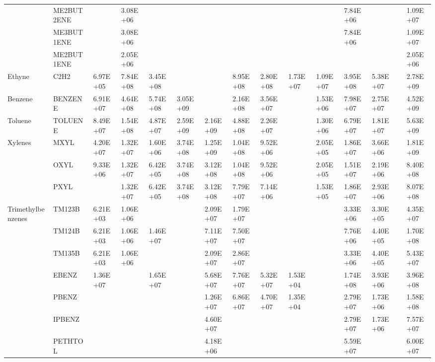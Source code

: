 \begin{longtable}{lllllllllllllll}
	 & ME2BUT2ENE &  & 3.08E+06 &  &  &  &  &  &  &  & 7.84E+06 &  &  & 1.09E+07 \\
	 & ME3BUT1ENE &  & 3.08E+06 &  &  &  &  &  &  &  & 7.84E+06 &  &  & 1.09E+07 \\
	 & ME2BUT1ENE &  & 2.05E+06 &  &  &  &  &  &  &  &  &  &  & 2.05E+06 \\
	\hline Ethyne & C2H2 & 6.97E+05 & 7.84E+08 & 3.45E+08 &  &  & 8.95E+08 & 2.80E+08 & 1.73E+07 & 1.09E+07 & 3.95E+08 & 5.38E+07 &  & 2.78E+09 \\ \hline
	Benzene & BENZENE & 6.91E+07 & 4.64E+08 & 5.74E+08 & 3.05E+09 &  & 2.16E+08 & 3.56E+07 &  & 1.53E+06 & 7.98E+07 & 2.75E+07 &  & 4.52E+09 \\
	\hline Toluene & TOLUENE & 8.49E+07 & 1.54E+08 & 4.87E+07 & 2.59E+09 & 2.16E+09 & 4.88E+08 & 2.26E+07 &  & 1.30E+06 & 6.79E+07 & 1.81E+07 &  & 5.63E+09 \\ \hline
	\multirow{3}{*}{Xylenes} & MXYL & 4.20E+07 & 1.32E+07 & 1.60E+06 & 3.74E+08 & 1.25E+09 & 1.04E+08 & 9.52E+06 &  & 2.05E+05 & 1.86E+07 & 3.66E+06 &  & 1.81E+09 \\
	 & OXYL & 9.33E+06 & 1.32E+07 & 6.42E+05 & 3.74E+08 & 3.12E+08 & 1.04E+08 & 9.52E+06 &  & 2.05E+05 & 1.51E+07 & 2.19E+06 &  & 8.40E+08 \\
	 & PXYL &  & 1.32E+07 & 6.42E+05 & 3.74E+08 & 3.12E+08 & 7.79E+07 & 7.14E+06 &  & 1.53E+05 & 1.86E+07 & 2.93E+06 &  & 8.07E+08 \\
	\hline \multirow{3}{*}{Trimethylbenzenes} & TM123B & 6.21E+03 & 1.06E+06 &  &  & 2.09E+07 & 1.79E+07 &  &  &  & 3.33E+06 & 3.30E+05 &  & 4.35E+07 \\
	 & TM124B & 6.21E+03 & 1.06E+06 & 1.46E+07 &  & 7.11E+07 & 7.50E+07 &  &  &  & 7.76E+06 & 4.40E+05 &  & 1.70E+08 \\
	 & TM135B & 6.21E+03 & 1.06E+06 &  &  & 2.09E+07 & 2.86E+07 &  &  &  & 3.33E+06 & 4.40E+05 &  & 5.43E+07 \\
	\hline \parbox[t]{2mm}{} & EBENZ & 1.36E+07 &  & 1.65E+07 &  & 5.68E+07 & 7.76E+07 & 5.32E+07 & 1.53E+04 &  & 1.74E+08 & 3.93E+06 &  & 3.96E+08 \\
	 & PBENZ &  &  &  &  & 1.26E+07 & 6.86E+07 & 4.70E+07 & 1.35E+04 &  & 2.79E+07 & 1.73E+06 &  & 1.58E+08 \\
	 & IPBENZ &  &  &  &  & 4.60E+07 &  &  &  &  & 2.79E+07 & 1.73E+06 &  & 7.57E+07 \\
	 & PETHTOL &  &  &  &  & 4.18E+06 &  &  &  &  & 5.59E+07 &  &  & 6.00E+07 \\

\end{longtable}

